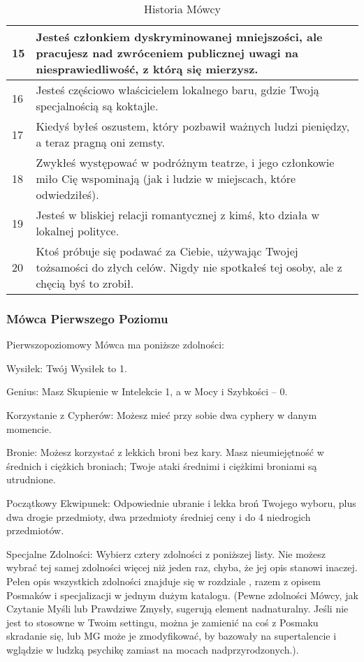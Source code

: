 \begin{table*}[t]
\begin{tabularx}{\textwidth}{| p{} | X |}
    15 & Jesteś członkiem dyskryminowanej mniejszości, ale pracujesz nad zwróceniem publicznej uwagi na niesprawiedliwość, z którą się mierzysz. \\ \hline
    16 & Jesteś częściowo właścicielem lokalnego baru, gdzie Twoją specjalnością są koktajle. \\ \hline
    17 & Kiedyś byłeś oszustem, który pozbawił ważnych ludzi pieniędzy, a teraz pragną oni zemsty. \\ \hline
    18 & Zwykłeś występować w podróżnym teatrze, i jego członkowie miło Cię wspominają (jak i ludzie w miejscach, które odwiedziłeś). \\ \hline
    19 & Jesteś w bliskiej relacji romantycznej z kimś, kto działa w lokalnej polityce. \\ \hline
    20 & Ktoś próbuje się podawać za Ciebie, używając Twojej tożsamości do złych celów. Nigdy nie spotkałeś tej osoby, ale z chęcią byś to zrobił.  \\ \hline
 \end{tabularx}
  \caption {Historia Mówcy}
  \label {Historia Mówcy}
 \end{table*}
 
  \afterpage{\clearpage}
 
 \subsubsection{Mówca Pierwszego Poziomu}

Pierwszopoziomowy Mówca ma poniższe zdolności:

Wysiłek: Twój Wysiłek to 1.

Genius: Masz Skupienie w Intelekcie 1, a w Mocy i Szybkości – 0.

Korzystanie z Cypherów: Możesz mieć przy sobie dwa cyphery w danym momencie.

Bronie: Możesz korzystać z lekkich broni bez kary. Masz nieumiejętność w średnich i ciężkich broniach; Twoje ataki średnimi i ciężkimi broniami są utrudnione.

Początkowy Ekwipunek: Odpowiednie ubranie i lekka broń Twojego wyboru, plus dwa drogie przedmioty, dwa przedmioty średniej ceny i do 4 niedrogich przedmiotów.

Specjalne Zdolności: Wybierz cztery zdolności z poniższej listy. Nie możesz wybrać tej samej zdolności więcej niż jeden raz, chyba, że jej opis stanowi inaczej. Pełen opis wszystkich zdolności znajduje się w rozdziale , razem z opisem Posmaków i specjalizacji w jednym dużym katalogu. (Pewne zdolności Mówcy, jak Czytanie Myśli lub Prawdziwe Zmysły, sugerują element nadnaturalny. Jeśli nie jest to stosowne w Twoim settingu, można je zamienić na coś z Posmaku skradanie się, lub MG może je zmodyfikować, by bazowały na supertalencie i wglądzie w ludzką psychikę zamiast na mocach nadprzyrodzonych.). 

